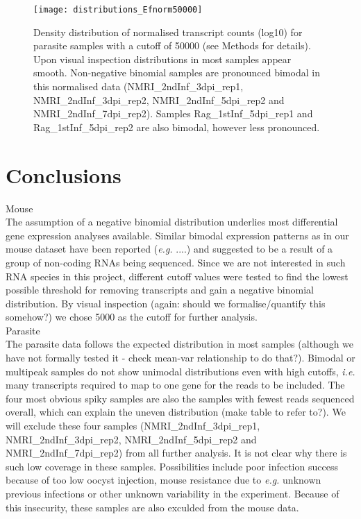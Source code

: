 \documentclass{article}
\begin{document}
\begin{figure}[h]
\begin{center}
\texttt{[image: distributions\_Efnorm50000]} %
\caption{Density distribution of normalised transcript counts (log10) for parasite samples with a cutoff of 50000 (see Methods for details). Upon visual inspection distributions in most samples appear smooth. Non-negative binomial samples are pronounced bimodal in this normalised data (NMRI\_2ndInf\_3dpi\_rep1, NMRI\_2ndInf\_3dpi\_rep2, NMRI\_2ndInf\_5dpi\_rep2 and NMRI\_2ndInf\_7dpi\_rep2). Samples Rag\_1stInf\_5dpi\_rep1 and Rag\_1stInf\_5dpi\_rep2 are also bimodal, however less pronounced.}
\end{center}
\end{figure}



\section{Conclusions}

Mouse\\
The assumption of a negative binomial distribution underlies most differential gene expression analyses available. Similar bimodal expression patterns as in our mouse dataset have been reported (\textit{e.g.} ....) and suggested to be a result of a group of non-coding RNAs being sequenced. Since we are not interested in such RNA species in this project, different cutoff values were tested to find the lowest possible threshold for removing transcripts and gain a negative binomial distribution. By visual inspection (again: should we formalise/quantify this somehow?) we chose 5000 as the cutoff for further analysis.  \\

Parasite\\
The parasite data follows the expected distribution in most samples (although we have not formally tested it - check mean-var relationship to do that?). Bimodal or multipeak samples do not show unimodal distributions even with high cutoffs, \textit{i.e.} many transcripts required to map to one gene for the reads to be included. The four most obvious spiky samples are also the samples with fewest reads sequenced overall, which can explain the uneven distribution (make table to refer to?). We will exclude these four samples (NMRI\_2ndInf\_3dpi\_rep1, NMRI\_2ndInf\_3dpi\_rep2, NMRI\_2ndInf\_5dpi\_rep2 and NMRI\_2ndInf\_7dpi\_rep2) from all further analysis. It is not clear why there is such low coverage in these samples. Possibilities include poor infection success because of too low oocyst injection, mouse resistance due to \textit{e.g.} unknown previous infections or other unknown variability in the experiment. Because of this insecurity, these samples are also exculded from the mouse data. \\
\end{document}
